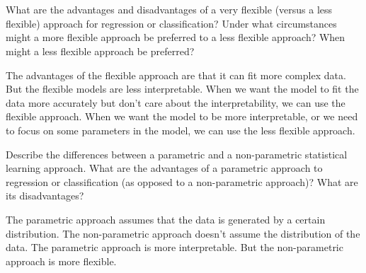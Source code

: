 \documentclass[14pt]{elegantbook}
\begin{document}

\chapter{}

\begin{exercise*}[5]
    What are the advantages and disadvantages of a very flexible (versus a less flexible) approach for regression or classification? Under what circumstances might a more flexible approach be preferred to a less flexible approach? When might a less flexible approach be preferred? 
\end{exercise*}

\begin{solution}
    The advantages of the flexible approach are that it can fit more complex data. But the flexible models are less interpretable. When we want the model to fit the data more accurately but don't care about the interpretability, we can use the flexible approach. When we want the model to be more interpretable, or we need to focus on some parameters in the model, we can use the less flexible approach. 
\end{solution}

\begin{exercise*}[6]
    Describe the differences between a parametric and a non-parametric statistical learning approach. What are the advantages of a parametric approach to regression or classification (as opposed to a non-parametric approach)? What are its disadvantages? 
\end{exercise*}

\begin{solution}
    The parametric approach assumes that the data is generated by a certain distribution. The non-parametric approach doesn't assume the distribution of the data. The parametric approach is more interpretable. But the non-parametric approach is more flexible. 
\end{solution}
\end{document}

